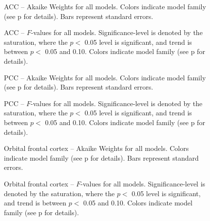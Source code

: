 \begin{figure}[tp]
    \centering
    \caption{ACC -- Akaike Weights for all models.  Colors indicate model family (see p\pageref{sub:cmb} for details). Bars represent standard errors.}
    \label{fig:ant}
\end{figure}
\begin{figure}[tp]
    \centering
    \caption{ACC -- $F$-values for all models.
    Significance-level is denoted by the saturation, where the $p <$ 0.05 level is
    significant, and trend is between $p <$ 0.05 and 0.10.  Colors indicate model family (see p\pageref{sub:cmb} for details).}
    \label{fig:fvalant}
\end{figure}


\begin{figure}[tp]
    \centering
    \caption{PCC -- Akaike Weights for all models.  Colors indicate model family (see p\pageref{sub:cmb} for details). Bars represent standard errors.}
    \label{fig:post}
\end{figure}
\begin{figure}[tp]
    \centering
    \caption{PCC -- $F$-values for all models.
    Significance-level is denoted by the saturation, where the $p <$ 0.05 level is
    significant, and trend is between $p <$ 0.05 and 0.10.  Colors indicate model family (see p\pageref{sub:cmb} for details).}
    \label{fig:fvalpost}
\end{figure}

\begin{figure}[tp]
    \centering
    \caption{Orbital frontal cortex -- Akaike Weights for all models.  Colors indicate model family (see p\pageref{sub:cmb} for details). Bars represent standard errors.}
    \label{fig:ofc}
\end{figure}
\begin{figure}[tp]
    \centering
    \caption{Orbital frontal cortex -- $F$-values for all models.
    Significance-level is denoted by the saturation, where the $p <$ 0.05 level is
    significant, and trend is between $p <$ 0.05 and 0.10.  Colors indicate model family (see p\pageref{sub:cmb} for details).}
    \label{fig:fvalofc}
\end{figure}


